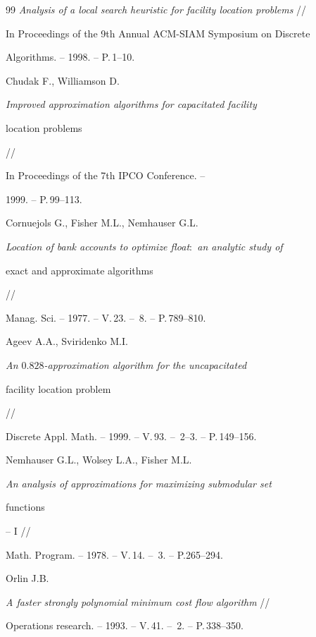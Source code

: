 \begin{thebibliography}{99}
{\em Analysis of a local search heuristic for facility location problems} //


In Proceedings of the 9th Annual ACM-SIAM Symposium on Discrete 


Algorithms. -- 1998. -- P.\,1--10.




Chudak F., Williamson D.


{\em Improved approximation algorithms for capacitated facility


location problems} //


In Proceedings of the 7th IPCO Conference. -- 


1999. -- P.\,99--113.




Cornuejols G., Fisher M.L., Nemhauser G.L.


{\em Location of bank accounts to optimize float\/$:$ an analytic study of


exact and approximate algorithms} //


Manag. Sci. -- 1977. -- V.\,23. -- \No\,8. -- P.\,789--810.




Ageev A.A., Sviridenko M.I. 


{\em An $0.828$-approximation algorithm for the uncapacitated


facility location problem} //


Discrete Appl. Math. -- 1999. -- V.\,93. -- \No\,2--3. -- P.\,149--156.




Nemhauser G.L., Wolsey L.A., Fisher M.L. 


{\em An analysis of approximations for maximizing submodular set


functions} -- I //


Math. Program. -- 1978. -- V.\,14. -- \No\,3. -- P.265--294.




Orlin J.B.


{\em A faster strongly polynomial minimum cost flow algorithm} //


Operations research. -- 1993. -- V.\,41. -- \No\,2. -- P.\,338--350. 





\end{thebibliography}





\vskip 2cm














\label{end}





